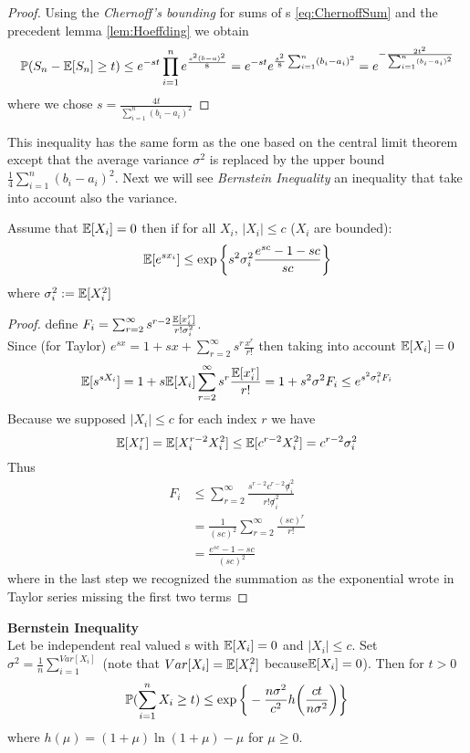 \begin{proof}
	Using the \textit{Chernoff's bounding} for sums of \rv s  \ref{eq:ChernoffSum} and the precedent lemma \ref{lem:Hoeffding} we obtain
	$$\mathbb{P}(S_n-\mathbb{E}[S_n]\geq t)\leq e^{-st} \prod_{i=1}^{n}e^{\frac{s^2(b-a)^2}{8}}=e^{-st}e^{\frac{s^2}{8}\sum_{i=1}^{n}(b_i-a_i)^2}=e^{-\frac{2t^2}{\sum_{i=1}^{n}(b_i-a_i)^2}}$$
	where we chose $s=\frac{4t}{\sum_{i=1}^{n}(b_i-a_i)^2}$
\end{proof}

This inequality has the same form as the one based on the central limit theorem except that the average variance $\sigma^2$ is replaced by the upper bound $\frac{1}{4}\sum_{i=1}^{n}(b_i-a_i)^2$. Next we will see \textit{Bernstein Inequality} an inequality that take into account also the variance.\\

\begin{lem} \label{lem:Bernstain}
	Assume that $\mathbb{E}[X_i]=0$ then if for all $X_i$, $|X_i|\leq c$ ($X_i$ are bounded):
	$$\mathbb{E} [e^{sx_i}] \leq \exp\bigg\{ s^2\sigma^2_i \frac{e^{sc}-1-sc}{sc} \bigg\}$$
	where $\sigma_i^2:=\mathbb{E}[X_i^2]$
\end{lem}
\begin{proof}
	define $F_i=\sum_{r=2}^{\infty} s^{r-2} \frac{\mathbb{E} [x_i^r]}{r! \sigma_i^2 }$.\\
	Since (for Taylor) $e^{sx}=1+sx+\sum_{r=2}^{\infty} s^r\frac{x^r}{r!}$ then taking into account  $\mathbb{E}[X_i]=0$
	$$\mathbb{E}[s^{sX_i}]=1+s \mathbb{E} [X_i] \sum_{r=2}^{\infty}s^r\frac{\mathbb{E} [x^r_i]}{r!}=1+s^2\sigma^2 F_i \leq e^{s^2\sigma_i^2F_i}$$
	Because we supposed $|X_i|\leq c$ for each index $r$ we have
	$$\mathbb{E}[X_i^r]= \mathbb{E} [X_i^{r-2}X_i^2] \leq \mathbb{E} [c^{r-2}X_i^2] = c^{r-2}\sigma_i^2$$
	Thus
	\[
	\begin{split}
	F_i
	& \leq \sum_{r=2}^{\infty}\frac{s^{r-2}c^{r-2} \not \sigma_i^2}{r! \not\sigma_i^2}\\
	& = \frac{1}{(sc)^2}\sum_{r=2}^{\infty}\frac{(sc)^{r}}{r!}\\
	&= \frac{e^{sc}-1-sc}{(sc)^2}
	\end{split}
	\]
	where in the last step we recognized the summation as the exponential wrote in Taylor series missing the first two terms
\end{proof}
\begin{teo}\textbf{Bernstein Inequality}\\
	Let \xii be independent real valued \rv s with $\mathbb{E}[X_i]=0$ and $|X_i|\leq c$. Set $\sigma^2=\frac{1}{n}\sum_{i=1}^{Var[X_i]}$ (note that $Var[X_i]=\mathbb{E}[X_i^2]$ because$\mathbb{E}[X_i]=0$). Then for $t>0$
	$$\mathbb{P}(\sum_{i=1}^{n}X_i\geq t)\leq \exp\bigg\{-\frac{n\sigma^2}{c^2} h\bigg(\frac{ct}{n\sigma^2} \bigg)\bigg\}$$
	where $h(\mu)=(1+\mu)\ln(1+\mu)-\mu$ for $\mu \geq 0$.
\end{teo}

